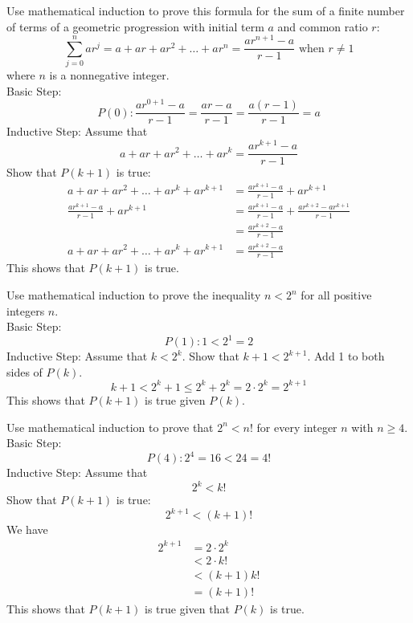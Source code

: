 \documentclass[12pt]{article}
\begin{document}
\begin{example} Use mathematical induction to prove this formula for the sum of a finite number of terms of a geometric progression with initial term $a$ and common ratio $r$: $$\sum_{j = 0}^n ar^j = a + ar + ar^2 + \dots + ar^n = \frac{ar^{n + 1}-a}{r - 1} \text{ when }r \neq 1$$ where $n$ is a nonnegative integer. \\ 
Basic Step:$$P(0): \frac{ar^{0 + 1} - a}{r - 1} = \frac{ar - a}{r - 1} = \frac{a(r - 1)}{r - 1} = a $$ 
Inductive Step: Assume that $$a + ar + ar^2 + \dots + ar^k = \frac{ar^{k + 1} - a}{r - 1}$$ Show that $P(k + 1)$ is true: $$\begin{aligned}  a + ar + ar^2 + \dots + ar^k + ar^{k + 1} &= \frac{ar^{k + 1} - a}{r - 1} + ar^{k + 1} \\ \frac{ar^{k + 1} - a}{r - 1} + ar^{k + 1} &= \frac{ar^{k + 1} - a}{r - 1} + \frac{ar^{k + 2} - ar^{k + 1}}{r - 1} \\ &= \frac{ar^{k + 2} - a}{r - 1} \\ a + ar + ar^2 + \dots + ar^k + ar^{k + 1} &= \frac{ar^{k + 2} - a}{r - 1} \end{aligned} $$ This shows that $P(k + 1)$ is true. \end{example} 
\begin{example} Use mathematical induction to prove the inequality $n < 2^n$ for all positive integers $n$. \\ Basic Step: $$P(1): 1 < 2^1 = 2 $$ 
Inductive Step: Assume that $k < 2^k$. Show that $k + 1 < 2^{k + 1}$. Add 1 to both sides of $P(k)$. 
$$k + 1 < 2^k + 1 \leq 2^k + 2^k = 2 \cdot 2^k = 2^{k + 1} $$ This shows that $P(k + 1)$ is true given $P(k)$. \end{example} 
\begin{example} Use mathematical induction to prove that $2^n < n!$ for every integer $n$ with $n \geq 4$. \\ Basic Step: $$P(4): 2^4 = 16 < 24 = 4! $$
Inductive Step: Assume that $$2^k < k!$$ Show that $P(k + 1)$ is true:$$ 2^{k + 1} < (k + 1)!$$
We have $$\begin{aligned} 2^{k + 1} &= 2 \cdot 2^k \\ &< 2 \cdot k! \\ &< (k + 1)k! \\ &= (k + 1)! \end{aligned} $$ This shows that $P(k + 1)$ is true given that $P(k)$ is true. \end{example} 
\end{document}
